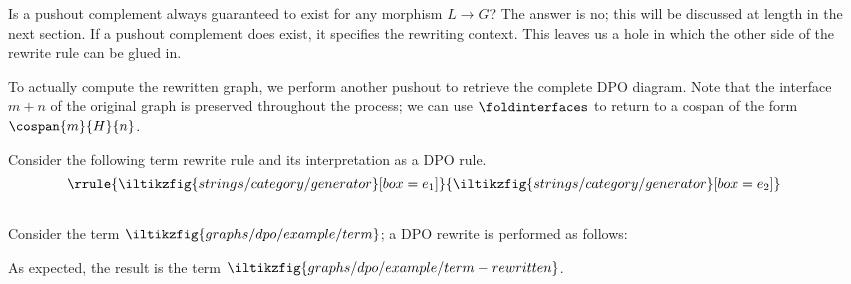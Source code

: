 Is a pushout complement always guaranteed to exist for any morphism \(L \to G\)?
The answer is no; this will be discussed at length in the next section.
If a pushout complement does exist, it specifies the rewriting context.
This leaves us a hole in which the other side of the rewrite rule can be glued
in.

\begin{center}
\end{center}

To actually compute the rewritten graph, we perform another pushout to retrieve
the complete DPO diagram.
Note that the interface \(m+n\) of the original graph is preserved throughout
the process; we can use \(\foldinterfaces\) to return to a cospan of the form
\(\cospan{m}{H}{n}\).

\begin{center}
\end{center}

\begin{example}
    Consider the following term rewrite rule and its interpretation as a DPO
    rule. \[
        \raisebox{1.5em}{\(\rrule{
                \iltikzfig{strings/category/generator}[box=e_1]
            }{
                \iltikzfig{strings/category/generator}[box=e_2]
            }\)}
        \qquad
        
    \]
    Consider the term \(
    \iltikzfig{graphs/dpo/example/term}
    \); a DPO rewrite is performed as follows:
    \begin{center}
        
    \end{center}
    As expected, the result is the term \(
    \iltikzfig{graphs/dpo/example/term-rewritten}
    \).
\end{example}